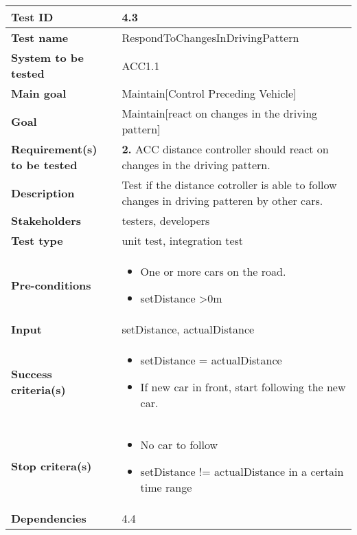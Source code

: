 	\begin{table}[H]
		\begin{tabular}{| p{4cm} | p{10cm} |}
			\hline
			\rowcolor{gray}
			{\bf Test ID} & 4.3 \\ \hline
			{\bf Test name} & RespondToChangesInDrivingPattern \\ \hline
			{\bf System to be tested} & ACC1.1\\ \hline
			{\bf Main goal} & Maintain[Control Preceding Vehicle] \\ \hline
			{\bf Goal} & Maintain[react on changes in the driving pattern] \\ \hline
			{\bf Requirement(s) to be tested} & {\bf 2.} ACC distance controller should 
			react on changes in the driving pattern.  \\ \hline
			{\bf Description} & Test if the distance cotroller is able to follow changes 
			in driving patteren by other cars.\\ \hline
			{\bf Stakeholders} & testers, developers \\ \hline
			{\bf Test type} & unit test, integration test \\ \hline
			{\bf Pre-conditions} & 
				\begin{itemize}
					\item One or more cars on the road.
					\item setDistance \textgreater 0m
				\end{itemize}\\ \hline
			{\bf Input} & setDistance, actualDistance \\ \hline
			{\bf Success criteria(s)} & 
				\begin{itemize}
					\item setDistance = actualDistance
					\item If new car in front, start following the new car.
				\end{itemize}\\ \hline
			{\bf Stop critera(s)} &  
				\begin{itemize}
					\item No car to follow
					\item setDistance != actualDistance in a certain time range
				\end{itemize}\\ \hline
			{\bf Dependencies} & 4.4\\ \hline
		\end{tabular}
	\end{table}

